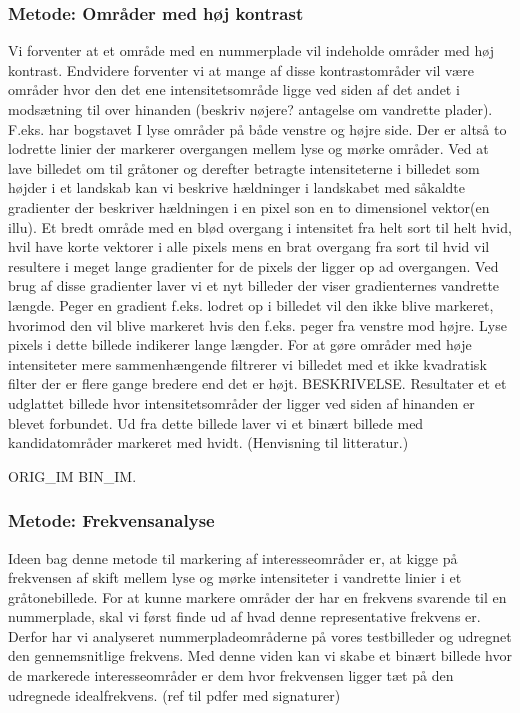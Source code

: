 \subsubsection*{Metode: Områder med høj kontrast}
Vi forventer at et område med en nummerplade vil indeholde områder med høj kontrast. Endvidere forventer vi at mange af disse kontrastområder vil være områder hvor den det ene intensitetsområde ligge ved siden af det andet i modsætning til over hinanden (beskriv nøjere? antagelse om vandrette plader). F.eks. har bogstavet I lyse områder på både venstre og højre side. Der er altså to lodrette linier der markerer overgangen mellem lyse og mørke områder. Ved at lave billedet om til gråtoner og derefter betragte intensiteterne i billedet som højder i et landskab kan vi beskrive hældninger i landskabet med såkaldte gradienter der beskriver hældningen i en pixel son en to dimensionel vektor(en illu). Et bredt område med en blød overgang i intensitet fra helt sort til helt hvid, hvil have korte vektorer i alle pixels mens en brat overgang fra sort til hvid vil resultere i meget lange gradienter for de pixels der ligger op ad overgangen. Ved brug af disse gradienter laver vi et nyt billeder der viser gradienternes vandrette længde. Peger en gradient f.eks. lodret op i billedet vil den ikke blive markeret, hvorimod den vil blive markeret hvis den f.eks. peger fra venstre mod højre. Lyse pixels i dette billede indikerer lange længder. For at gøre områder med høje intensiteter mere sammenhængende filtrerer vi billedet med et ikke kvadratisk filter der er flere gange bredere end det er højt. BESKRIVELSE. Resultater et et udglattet billede hvor intensitetsområder der ligger ved siden af hinanden er blevet forbundet. Ud fra dette billede laver vi et binært billede med kandidatområder markeret med hvidt. (Henvisning til litteratur.)

ORIG\_IM BIN\_IM.


\subsubsection*{Metode: Frekvensanalyse}
\label{sec_frekvensanalyse} 
Ideen bag denne metode til markering af interesseområder er, at kigge på frekvensen af skift mellem lyse og mørke intensiteter i vandrette linier i et gråtonebillede. For at kunne markere områder der har en frekvens svarende til en nummerplade, skal vi først finde ud af hvad denne representative frekvens er. Derfor har vi analyseret nummerpladeområderne på vores testbilleder og udregnet den gennemsnitlige frekvens. Med denne viden kan vi skabe et binært billede hvor de markerede interesseområder er dem hvor frekvensen ligger tæt på den udregnede idealfrekvens. (ref til pdfer med signaturer)

